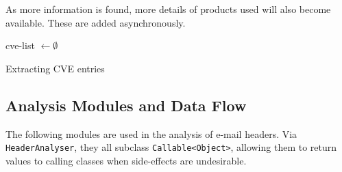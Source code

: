 As more information is found, more details of products used will also become
available.  These are added asynchronously.

\begin{algorithm}
	cve-list $\gets\emptyset$\;
	\;
	\caption{Extracting CVE entries}
    \label{alg:db}
\end{algorithm}

\subsection{Analysis Modules and Data Flow}

The following modules are used in the analysis of e-mail headers. Via
\texttt{HeaderAnalyser}, they all subclass \texttt{Callable<Object>}, allowing
them to return values to calling classes when side-effects are undesirable.

